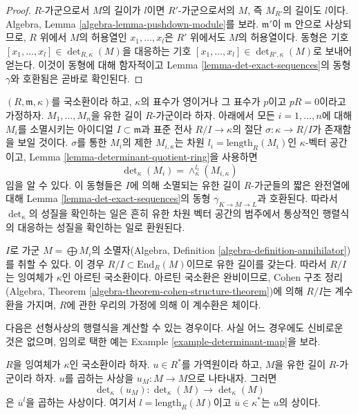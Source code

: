 \begin{proof}
$R$-가군으로서 $M$의 길이가 $l$이면 $R'$-가군으로서의 $M$, 즉
$M_{R'}$의 길이도 $l$이다. Algebra, Lemma
\ref{algebra-lemma-pushdown-module}를 보라. $\mathfrak m'$이
$\mathfrak m$ 안으로 사상되므로, $R$ 위에서 $M$의 허용열인
$x_1, \ldots, x_l$은 $R'$ 위에서도 $M$의 허용열이다. 동형은 기호
$[x_1, \ldots, x_l] \in \det\nolimits_{R, \kappa}(M)$을 대응하는 기호
$[x_1, \ldots, x_l] \in \det\nolimits_{R', \kappa}(M)$로 보내어 얻는다.
이것이 동형에 대해 함자적이고 Lemma \ref{lemma-det-exact-sequences}의
동형 $\gamma$와 호환됨은 곧바로 확인된다.
\end{proof}

\begin{remark}
\label{remark-explain-determinant}
$(R, \mathfrak m, \kappa)$를 국소환이라 하고, $\kappa$의 표수가
영이거나 그 표수가 $p$이고 $p R = 0$이라고 가정하자.
$M_1, \ldots, M_n$을 유한 길이 $R$-가군이라 하자. 아래에서 모든
$i = 1, \ldots, n$에 대해 $M_i$를 소멸시키는 아이디얼
$I \subset \mathfrak m$과 표준 전사 $R/I \to \kappa$의 절단
$\sigma : \kappa \to R/I$가 존재함을 보일 것이다. $\sigma$를 통한
$M_i$의 제한 $M_{i, \kappa}$는 차원
$l_i = \text{length}_R(M_i)$인 $\kappa$-벡터 공간이고, Lemma
\ref{lemma-determinant-quotient-ring}을 사용하면
$$
\det\nolimits_\kappa(M_i) = \wedge_\kappa^{l_i}(M_{i, \kappa})
$$
임을 알 수 있다. 이 동형들은 $I$에 의해 소멸되는 유한 길이
$R$-가군들의 짧은 완전열에 대해 Lemma
\ref{lemma-det-exact-sequences}의 동형 $\gamma_{K \to M \to L}$과
호환된다. 따라서 $\det_\kappa$의 성질을 확인하는 일은 흔히 유한 차원
벡터 공간의 범주에서 통상적인 행렬식의 대응하는 성질을 확인하는 일로
환원된다.

\medskip\noindent
$I$로 가군 $M = \bigoplus M_i$의 소멸자(Algebra, Definition
\ref{algebra-definition-annihilator})를 취할 수 있다. 이 경우
$R/I \subset \text{End}_R(M)$이므로 유한 길이를 갖는다.
따라서 $R/I$는 잉여체가 $\kappa$인 아르틴 국소환이다. 아르틴 국소환은
완비이므로, Cohen 구조 정리(Algebra, Theorem
\ref{algebra-theorem-cohen-structure-theorem})에 의해 $R/I$는 계수환을
가지며, $R$에 관한 우리의 가정에 의해 이 계수환은 체이다.
\end{remark}

\noindent
다음은 선형사상의 행렬식을 계산할 수 있는 경우이다. 사실 어느
경우에도 신비로운 것은 없으며, 임의로 택한 예는 Example
\ref{example-determinant-map}을 보라.

\begin{lemma}
\label{lemma-times-u-determinant}
$R$을 잉여체가 $\kappa$인 국소환이라 하자. $u \in R^*$를 가역원이라
하고, $M$을 유한 길이 $R$-가군이라 하자. $u$를 곱하는 사상을
$u_M : M \to M$으로 나타내자. 그러면
$$
\det\nolimits_\kappa(u_M) :
\det\nolimits_\kappa(M)
\longrightarrow
\det\nolimits_\kappa(M)
$$
은 $\overline{u}^l$을 곱하는 사상이다. 여기서
$l = \text{length}_R(M)$이고 $\overline{u} \in \kappa^*$는 $u$의
상이다.
\end{lemma}


